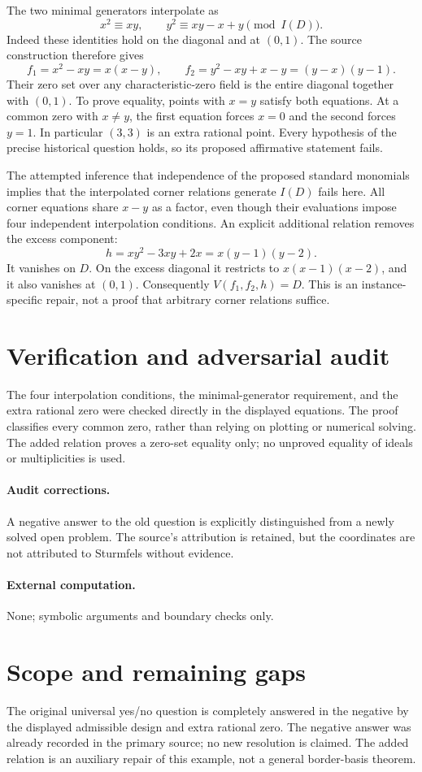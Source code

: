\documentclass[11pt]{article}
\begin{document}
The two minimal generators interpolate as
\[
x^2\equiv xy,\qquad y^2\equiv xy-x+y\pmod{I(D)}.
\]
Indeed these identities hold on the diagonal and at $(0,1)$. The source construction therefore gives
\[
f_1=x^2-xy=x(x-y),\qquad
f_2=y^2-xy+x-y=(y-x)(y-1).
\]
Their zero set over any characteristic-zero field is the entire diagonal together with $(0,1)$. To prove equality, points with $x=y$ satisfy both equations. At a common zero with $x\ne y$, the first equation forces $x=0$ and the second forces $y=1$. In particular $(3,3)$ is an extra rational point. Every hypothesis of the precise historical question holds, so its proposed affirmative statement fails.

The attempted inference that independence of the proposed standard monomials implies that the interpolated corner relations generate $I(D)$ fails here. All corner equations share $x-y$ as a factor, even though their evaluations impose four independent interpolation conditions. An explicit additional relation removes the excess component:
\[
h=xy^2-3xy+2x=x(y-1)(y-2).
\]
It vanishes on $D$. On the excess diagonal it restricts to $x(x-1)(x-2)$, and it also vanishes at $(0,1)$. Consequently $V(f_1,f_2,h)=D$. This is an instance-specific repair, not a proof that arbitrary corner relations suffice.
\section{Verification and adversarial audit}
The four interpolation conditions, the minimal-generator requirement, and the extra rational zero were checked directly in the displayed equations. The proof classifies every common zero, rather than relying on plotting or numerical solving. The added relation proves a zero-set equality only; no unproved equality of ideals or multiplicities is used.
\paragraph{Audit corrections.} A negative answer to the old question is explicitly distinguished from a newly solved open problem. The source's attribution is retained, but the coordinates are not attributed to Sturmfels without evidence.
\paragraph{External computation.} None; symbolic arguments and boundary checks only.
\section{Scope and remaining gaps}
The original universal yes/no question is completely answered in the negative by
the displayed admissible design and extra rational zero. The negative answer was
already recorded in the primary source; no new resolution is claimed. The added
relation is an auxiliary repair of this example, not a general border-basis theorem.
\end{document}
